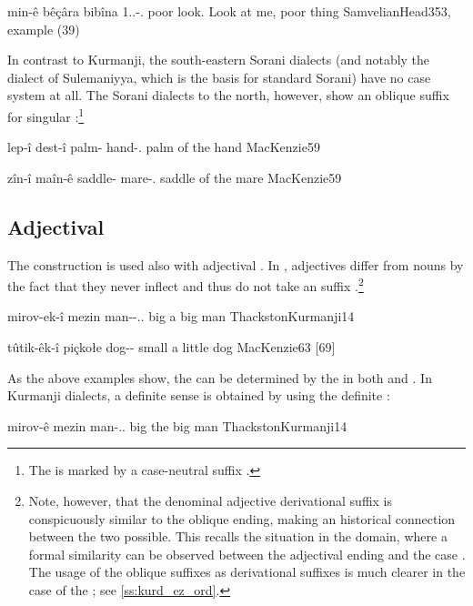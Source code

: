 {min-ê bêçâra bibîna}
{1.\sg.\obl-\ez.\masc{} poor look.\imp}
{Look at me, poor thing}
{SamvelianHead}{353, example (39)}

In contrast to Kurmanji, the south-eastern Sorani dialects (and notably the dialect of Sulemaniyya, which is the basis for standard Sorani) have no case system at all. The Sorani dialects to the north, however, show an oblique suffix for singular \secns:\footnote{The \pl* is marked by a case-neutral suffix  \citep[58]{MacKenzie}.}

{lep-î dest-î}
{palm-\ez{} hand-\obl.\masc{}}
{palm of the hand}
{MacKenzie}{59}

{zîn-î maîn-ê}
{saddle-\ez{} mare-\obl.\fem{}}
{saddle of the mare}
{MacKenzie}{59}

\newpage 
\subsection{Adjectival \secns}


The \ez* construction is used also with adjectival \secns. In \Kur, adjectives differ from nouns by the fact that they never inflect and thus do not take an \obl* suffix \citep[163]{MacKenzie}.\footnote{Note, however, that the denominal adjective derivational suffix  is conspicuously similar to the \masc* \sg* oblique ending, making an historical connection between the two possible. This recalls the situation in the  domain, where  a formal similarity can be observed between the \Arab adjectival ending  and the \gen* case . The usage of the oblique suffixes as derivational suffixes is much clearer in the case of the \Kur {}; see \ref{ss:kurd_ez_ord}.}


{mirov-ek-î mezin}
{man-\indef-\ez.\indef.\masc{} big}
{a big man}
{ThackstonKurmanji}{14}

{tûtik-êk-î piçkołe}
{dog-\indef-\ez{} small}
{a little dog}
{MacKenzie}{63 {[69]}}


As the above examples show, the \prim can be determined by the  in both \Kur and \Sor. In Kurmanji dialects, a definite sense is obtained by using the definite \ez*:

{mirov-ê mezin}
{man-\ez..\masc{} big}
{the big man}
{ThackstonKurmanji}{14}

